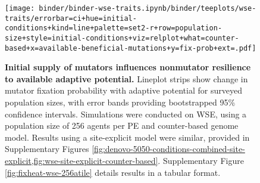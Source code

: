 \begin{figure}[h]
\begin{minipage}{0.6\textwidth}
  \texttt{[image: binder/binder-wse-traits.ipynb/binder/teeplots/wse-traits/errorbar=ci+hue=initial-conditions+kind=line+palette=set2-r+row=population-size+style=initial-conditions+viz=relplot+what=counter-based+x=available-beneficial-mutations+y=fix-prob+ext=.pdf]}%
\end{minipage}%
\begin{minipage}{0.4\textwidth}
  \caption{
  \textbf{Initial supply of mutators influences nonmutator resilience to available adaptive potential.}
  \footnotesize
  Lineplot strips show change in mutator fixation probability with adaptive potential for surveyed population sizes, with error bands providing bootstrapped 95\% confidence intervals.
  Simulations were conducted on WSE, using a population size of 256 agents per PE and counter-based genome model.
  Results using a site-explicit model were similar, provided in Supplementary Figures \cref{fig:denovo-5050-conditions-combined-site-explicit,fig:wse-site-explicit-counter-based}.
  Supplementary Figure \ref{fig:fixheat-wse-256atile} details results in a tabular format.
    }
    \label{fig:denovo-5050-conditions-combined}
  \end{minipage}
\end{figure}
